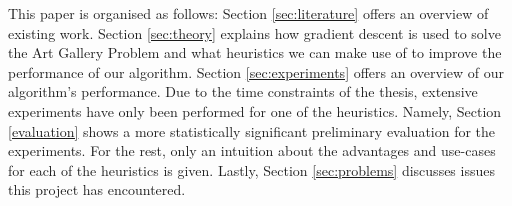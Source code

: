 This paper is organised as follows: Section \ref{sec:literature} offers an overview of existing work. Section \ref{sec:theory} explains how gradient descent is used to solve the Art Gallery Problem and what heuristics we can make use of to improve the performance of our algorithm. Section \ref{sec:experiments} offers an overview of our algorithm's performance. Due to the time constraints of the thesis, extensive experiments have only been performed for one of the heuristics. Namely, Section \ref{evaluation} shows a more statistically significant preliminary evaluation for the experiments. For the rest, only an intuition about the advantages and use-cases for each of the heuristics is given. 
Lastly, Section \ref{sec:problems} discusses issues this project has encountered.
